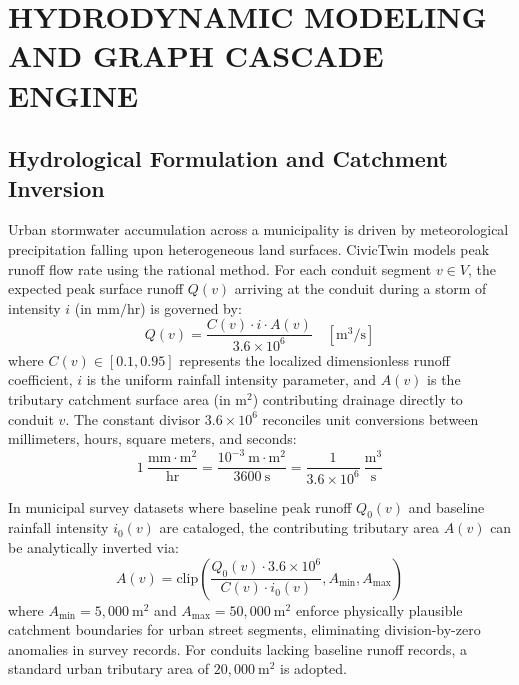 \chapter{HYDRODYNAMIC MODELING AND GRAPH CASCADE ENGINE}

\section{Hydrological Formulation and Catchment Inversion}
Urban stormwater accumulation across a municipality is driven by meteorological precipitation falling upon heterogeneous land surfaces. CivicTwin models peak runoff flow rate using the rational method. For each conduit segment $v \in V$, the expected peak surface runoff $Q(v)$ arriving at the conduit during a storm of intensity $i$ (in $\text{mm}/\text{hr}$) is governed by:
\begin{equation}
Q(v) = \frac{C(v) \cdot i \cdot A(v)}{3.6 \times 10^6} \quad [\text{m}^3/\text{s}]
\label{eqn:rational_specific}
\end{equation}
where $C(v) \in [0.1, 0.95]$ represents the localized dimensionless runoff coefficient, $i$ is the uniform rainfall intensity parameter, and $A(v)$ is the tributary catchment surface area (in $\text{m}^2$) contributing drainage directly to conduit $v$. The constant divisor $3.6 \times 10^6$ reconciles unit conversions between millimeters, hours, square meters, and seconds:
\begin{equation}
1~\frac{\text{mm} \cdot \text{m}^2}{\text{hr}} = \frac{10^{-3}~\text{m} \cdot \text{m}^2}{3600~\text{s}} = \frac{1}{3.6 \times 10^6}~\frac{\text{m}^3}{\text{s}}
\end{equation}

In municipal survey datasets where baseline peak runoff $Q_0(v)$ and baseline rainfall intensity $i_0(v)$ are cataloged, the contributing tributary area $A(v)$ can be analytically inverted via:
\begin{equation}
A(v) = \text{clip}\left(\frac{Q_0(v) \cdot 3.6 \times 10^6}{C(v) \cdot i_0(v)}, A_{\min}, A_{\max}\right)
\label{eqn:area_inversion}
\end{equation}
where $A_{\min} = 5{,}000~\text{m}^2$ and $A_{\max} = 50{,}000~\text{m}^2$ enforce physically plausible catchment boundaries for urban street segments, eliminating division-by-zero anomalies in survey records. For conduits lacking baseline runoff records, a standard urban tributary area of $20{,}000~\text{m}^2$ is adopted.

